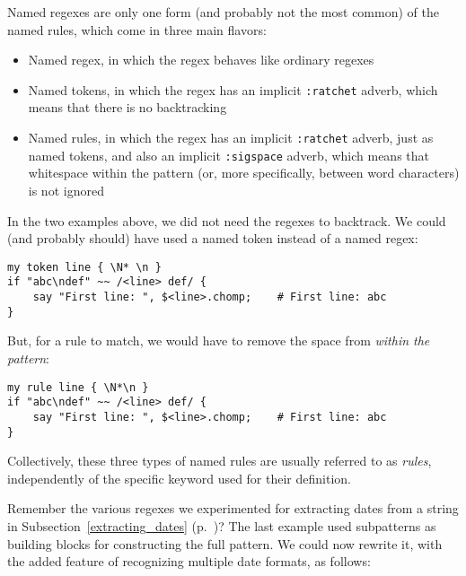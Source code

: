 Named regexes are only one form (and probably not the 
most common) of the named rules, which 
come in three main flavors:
\begin{itemize}
\item Named regex, in which the regex behaves like ordinary 
regexes
\item Named tokens, in which the regex has an implicit 
{\tt :ratchet} adverb, which means that there is no 
backtracking
\item Named rules, in which the regex has an implicit 
{\tt :ratchet} adverb, just as named tokens, and also 
an implicit {\tt :sigspace} adverb, which means that 
whitespace within the pattern (or, more specifically, 
between word characters) is not ignored
\end{itemize}

In the two examples above, we did not need the regexes 
to backtrack. We could (and probably should) have used 
a named token instead of a named regex:

\begin{verbatim}
my token line { \N* \n }
if "abc\ndef" ~~ /<line> def/ {
    say "First line: ", $<line>.chomp;    # First line: abc
}
\end{verbatim} 

But, for a rule to match, we would have to remove the 
space from \emph{within the pattern}:

\begin{verbatim}
my rule line { \N*\n }
if "abc\ndef" ~~ /<line> def/ {
    say "First line: ", $<line>.chomp;    # First line: abc
}
\end{verbatim} 

Collectively, these three types of named rules are usually 
referred to as \emph{rules}, independently of the specific 
keyword used for their definition.

Remember the various regexes we experimented for 
extracting dates from a string in 
Subsection~\ref{extracting_dates} 
(p.~\pageref{extracting_dates})? The last example 
used subpatterns as building blocks for constructing 
the full pattern. We could now rewrite it, with the 
added feature of recognizing multiple date formats, as 
follows:

